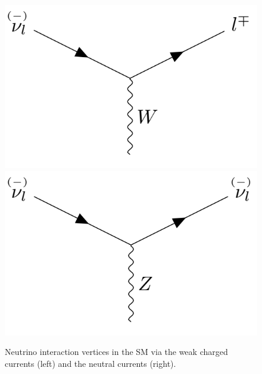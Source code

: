 \begin{figure}[hbtp]
\centering
\includegraphics[width=.4\linewidth]{Plots/Theory/NeutrinoCCInteractionVertices.png}
\hspace{0.1\linewidth}
\includegraphics[width=.4\linewidth]{Plots/Theory/NeutrinoNCInteractionVertices.png}
\caption[Neutrino interaction vertices in the SM]{Neutrino interaction vertices in the \acrshort{SM} via the weak charged currents (left) and the neutral currents (right).}
\label{fig:FeynmanNuIntVertices}
\end{figure}





